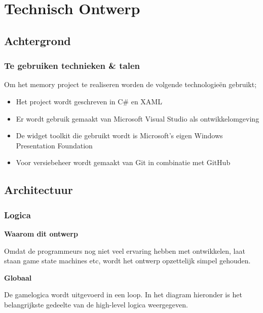 \documentclass[a4paper,titlepage,11pt]{article}
\begin{document}
\clearpage

\section{Technisch Ontwerp}

\subsection{Achtergrond}

\subsubsection{Te gebruiken technieken \& talen}

Om het memory project te realiseren worden de volgende technologieën gebruikt;
\begin{itemize}
\item Het project wordt geschreven in C\# en XAML
\item Er wordt gebruik gemaakt van Microsoft Visual Studio als ontwikkelomgeving
\item De widget toolkit die gebruikt wordt is Microsoft’s eigen Windows Presentation Foundation
\item Voor versiebeheer wordt gemaakt van Git in combinatie met GitHub
\end{itemize}

\subsection{Architectuur}

\subsubsection{Logica}

{\bf Waarom dit ontwerp}

Omdat de programmeurs nog niet veel ervaring hebben met ontwikkelen, laat staan
game state machines etc, wordt het ontwerp opzettelijk simpel gehouden.

{\bf Globaal}

De gamelogica wordt uitgevoerd in een loop. 
In het diagram hieronder is het belangrijkste gedeelte
van de high-level logica weergegeven. 
\end{document}
